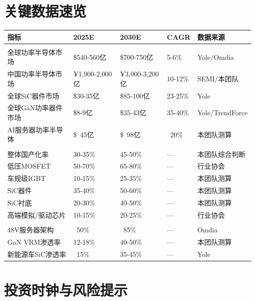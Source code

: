 \section{关键数据速览}

\begin{exhibitbox}[表 1-2：核心数据一览]
\centering
\small
\begin{tabularx}{\textwidth}{X L{2.8cm} L{2.8cm} L{2.8cm} L{2.5cm}}
\toprule
\textbf{指标} & \textbf{2025E} & \textbf{2030E} & \textbf{CAGR} & \textbf{数据来源} \\
\midrule
{}
 \\
全球功率半导体市场 & \$540-560亿 & \$700-750亿 & 5-6\% & Yole/Omdia \\
中国功率半导体市场 & ¥1,900-2,000亿 & ¥3,000-3,200亿 & 10-12\% & SEMI/本团队 \\
全球SiC器件市场 & \$30-35亿 & \$85-100亿 & 23-25\% & Yole \\
全球GaN功率器件市场 & \$8-9亿 & \$35-43亿 & 35-40\% & Yole/TrendForce \\
AI服务器功率半导体 & \$~45亿 & \$~98亿 & ~20\% & 本团队测算 \\
\midrule
{}
 \\
整体国产化率 & 30-35\% & 45-50\% & — & 本团队综合判断 \\
低压MOSFET & 50-70\% & 65-80\% & — & 行业协会 \\
车规级IGBT & 10-15\% & 25-35\% & — & 本团队测算 \\
SiC器件 & 35-40\% & 50-60\% & — & 本团队测算 \\
SiC衬底 & 20-30\% & 40-50\% & — & 本团队测算 \\
高端模拟/驱动芯片 & 10-15\% & 20-25\% & — & 行业协会 \\
\midrule
{}
 \\
48V服务器架构 & ~50\% & ~85\% & — & Omdia \\
GaN VRM渗透率 & 12-18\% & 40-50\% & — & 本团队测算 \\
新能源车SiC渗透率 & ~15\% & 35-45\% & — & Yole \\
\bottomrule
\end{tabularx}
\end{exhibitbox}

\section{投资时钟与风险提示}

